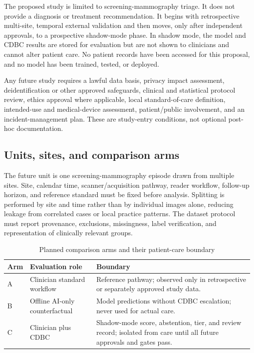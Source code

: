 \documentclass[conference]{IEEEtran}
\begin{document}
The proposed study is limited to screening-mammography triage. It does not provide a diagnosis or treatment recommendation. It begins with retrospective multi-site, temporal external validation and then moves, only after independent approvals, to a prospective shadow-mode phase. In shadow mode, the model and CDBC results are stored for evaluation but are not shown to clinicians and cannot alter patient care. No patient records have been accessed for this proposal, and no model has been trained, tested, or deployed.

Any future study requires a lawful data basis, privacy impact assessment, deidentification or other approved safeguards, clinical and statistical protocol review, ethics approval where applicable, local standard-of-care definition, intended-use and medical-device assessment, patient/public involvement, and an incident-management plan. These are study-entry conditions, not optional post-hoc documentation.

\subsection{Units, sites, and comparison arms}

The future unit is one screening-mammography episode drawn from multiple sites. Site, calendar time, scanner/acquisition pathway, reader workflow, follow-up horizon, and reference standard must be fixed before analysis. Splitting is performed by site and time rather than by individual images alone, reducing leakage from correlated cases or local practice patterns. The dataset protocol must report provenance, exclusions, missingness, label verification, and representation of clinically relevant groups.

\begin{table}[t]
\caption{Planned comparison arms and their patient-care boundary}
\label{tab:arms}
\centering
\footnotesize
\begin{tabular}{p{}p{}p{}}
\toprule
\textbf{Arm} & \textbf{Evaluation role} & \textbf{Boundary}\\
\midrule
A & Clinician standard workflow & Reference pathway; observed only in retrospective or separately approved study data.\\
B & Offline AI-only counterfactual & Model predictions without CDBC escalation; never used for actual care.\\
C & Clinician plus CDBC & Shadow-mode score, abstention, tier, and review record; isolated from care until all future approvals and gates pass.\\
\bottomrule
\end{tabular}
\end{table}
\end{document}
